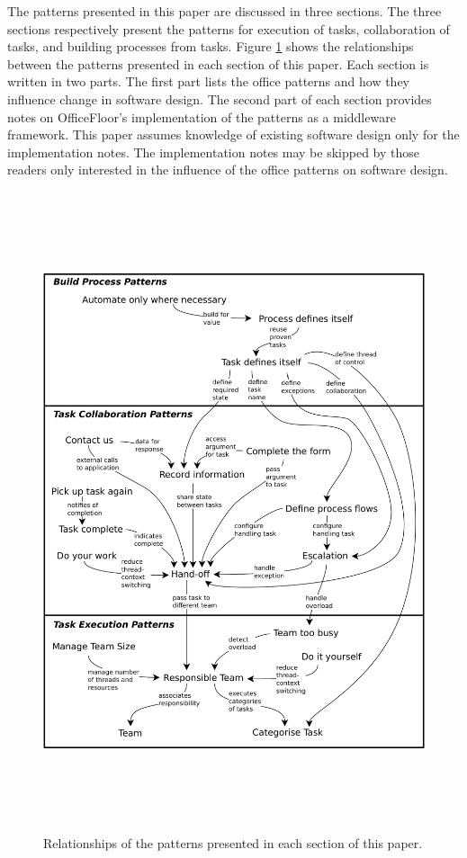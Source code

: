\documentclass[prodmode]{style/acmlarge}
\begin{document}
The patterns presented in this paper are discussed in three sections.  The three
sections respectively present the patterns for execution of tasks, collaboration
of tasks, and building processes from tasks.  Figure
\ref{fig:PatternRelationships} shows the relationships between the patterns
presented in each section of this paper.  Each section is written in two parts.
The first part lists the office patterns and how they influence change in
software design.  The second part of each section provides notes on
OfficeFloor's implementation of the patterns as a middleware framework.  This
paper assumes knowledge of existing software design only for the implementation
notes.  The implementation notes may be skipped by those readers only interested
in the influence of the office patterns on software design.

\begin{figure}[!t]
\centering
\includegraphics[height=7.4in]{PatternRelationships}
\caption{Relationships of the patterns presented in each section of this paper.}
\label{fig:PatternRelationships}
\end{figure}
\end{document}
